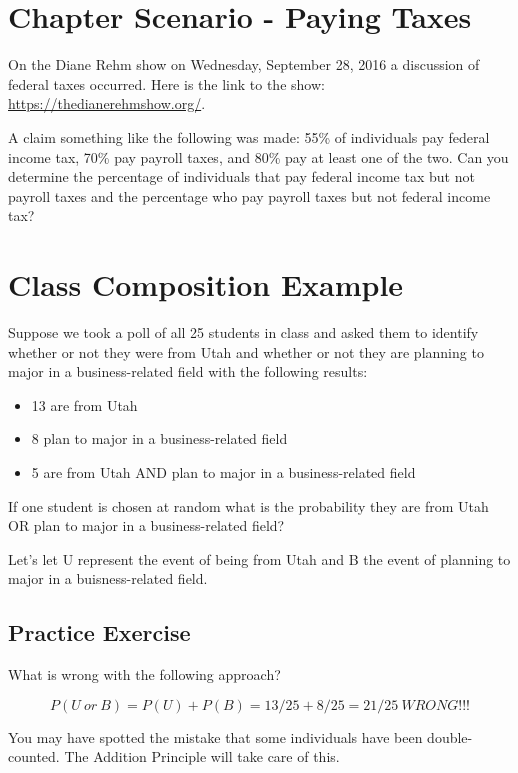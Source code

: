 \documentclass[]{book}
\providecommand{\tightlist}{%
  \setlength{\itemsep}{0pt}\setlength{\parskip}{0pt}}
\theoremstyle{definition}
\theoremstyle{definition}
\theoremstyle{definition}
\theoremstyle{remark}
\begin{document}
\section{Chapter Scenario - Paying
Taxes}\label{chapter_scenario_paying_taxes}

On the Diane Rehm show on Wednesday, September 28, 2016 a discussion of
federal taxes occurred. Here is the link to the show:
\url{https://thedianerehmshow.org/}.

A claim something like the following was made: 55\% of individuals pay
federal income tax, 70\% pay payroll taxes, and 80\% pay at least one of
the two. Can you determine the percentage of individuals that pay
federal income tax but not payroll taxes and the percentage who pay
payroll taxes but not federal income tax?

\section{Class Composition Example}\label{class-composition-example}

Suppose we took a poll of all 25 students in class and asked them to
identify whether or not they were from Utah and whether or not they are
planning to major in a business-related field with the following
results:

\begin{itemize}
\tightlist
\item
  13 are from Utah
\item
  8 plan to major in a business-related field
\item
  5 are from Utah AND plan to major in a business-related field
\end{itemize}

If one student is chosen at random what is the probability they are from
Utah OR plan to major in a business-related field?

Let's let U represent the event of being from Utah and B the event of
planning to major in a buisness-related field.

\subsection{Practice Exercise}\label{practice-exercise-7}

What is wrong with the following approach?

\[P(U \ or \ B) = P(U)+P(B)= 13/25 + 8/25 = 21/25 \ WRONG!!!\]

You may have spotted the mistake that some individuals have been
double-counted. The Addition Principle will take care of this.
\end{document}
